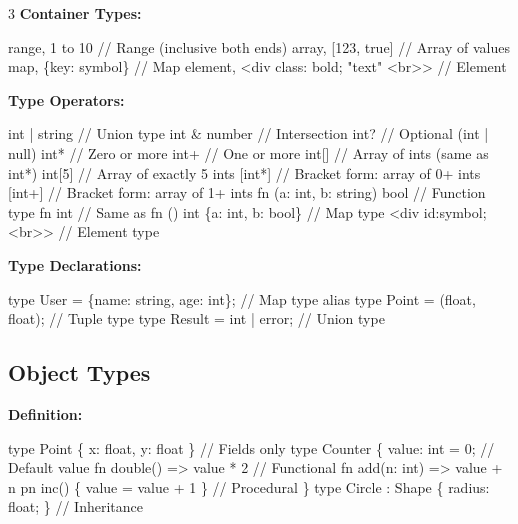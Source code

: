 \documentclass[8pt,landscape,a4paper,oneside]{article}
\newenvironment{Shaded}{%
  \begin{snugshade}%
  \vspace{0.4\baselineskip}%
  \fontsize{9}{10}\selectfont%
  \setlength{\parskip}{0pt}%
  \setlength{\topsep}{0pt}%
  \setlength{\partopsep}{0pt}%
}{%
  \vspace{0.01\baselineskip}%
  \end{snugshade}%
}
\newcommand{\NormalTok}[1]{#1}
\begin{document}
\begin{multicols*}{3}
\textbf{Container Types:}

\begin{Shaded}
\begin{Highlighting}[]
\NormalTok{range, 1 to 10          // Range (inclusive both ends)}
\NormalTok{array, [123, true]      // Array of values}
\NormalTok{map, \{key: \textquotesingle{}symbol\textquotesingle{}\}    // Map}
\NormalTok{element, \textless{}div class: bold; "text" \textless{}br\textgreater{}\textgreater{}  // Element}
\end{Highlighting}
\end{Shaded}

\textbf{Type Operators:}

\begin{Shaded}
\begin{Highlighting}[]
\NormalTok{int | string     // Union type}
\NormalTok{int \& number     // Intersection}
\NormalTok{int?             // Optional (int | null)}
\NormalTok{int*             // Zero or more}
\NormalTok{int+             // One or more}
\NormalTok{int[]            // Array of ints (same as int*)}
\NormalTok{int[5]           // Array of exactly 5 ints}
\NormalTok{[int*]           // Bracket form: array of 0+ ints}
\NormalTok{[int+]           // Bracket form: array of 1+ ints}
\NormalTok{fn (a: int, b: string) bool   // Function type}
\NormalTok{fn int                        // Same as fn () int}
\NormalTok{\{a: int, b: bool\}             // Map type}
\NormalTok{\textless{}div id:symbol; \textless{}br\textgreater{}\textgreater{}         // Element type}
\end{Highlighting}
\end{Shaded}

\textbf{Type Declarations:}

\begin{Shaded}
\begin{Highlighting}[]
\NormalTok{type User = \{name: string, age: int\};   // Map type alias}
\NormalTok{type Point = (float, float);            // Tuple type}
\NormalTok{type Result = int | error;              // Union type}
\end{Highlighting}
\end{Shaded}

\subsection{Object Types}\label{object-types}

\textbf{Definition:}

\begin{Shaded}
\begin{Highlighting}[]
\NormalTok{type Point \{ x: float, y: float \}     // Fields only}
\NormalTok{type Counter \{}
\NormalTok{    value: int = 0;                   // Default value}
\NormalTok{    fn double() =\textgreater{} value * 2          // Functional}
\NormalTok{    fn add(n: int) =\textgreater{} value + n}
\NormalTok{    pn inc() \{ value = value + 1 \}    // Procedural}
\NormalTok{\}}
\NormalTok{type Circle : Shape \{ radius: float; \}  // Inheritance}
\end{Highlighting}
\end{Shaded}


\end{multicols*}
\end{document}
